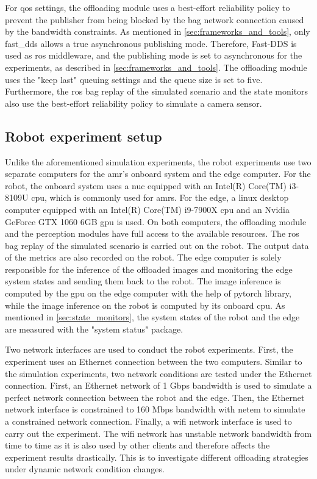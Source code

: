 For \gls{qos} settings, the offloading module uses a best-effort reliability policy to prevent the publisher from being blocked by the bag network connection caused by the bandwidth constraints. As mentioned in \cref{sec:frameworks_and_tools}, only \gls{fast_dds} allows a true asynchronous publishing mode. Therefore, Fast-DDS is used as \gls{ros} middleware, and the publishing mode is set to asynchronous for the experiments, as described in \cref{sec:frameworks_and_tools}. The offloading module uses the "keep last" queuing settings and the queue size is set to five. Furthermore, the \gls{ros} bag replay of the simulated scenario and the state monitors also use the best-effort reliability policy to simulate a camera sensor. 

\subsection{Robot experiment setup}

Unlike the aforementioned simulation experiments, the robot experiments use two separate computers for the \gls{amr}'s onboard system and the edge computer. For the robot, the onboard system uses a \gls{nuc} equipped with an Intel(R) Core(TM) i3-8109U \gls{cpu}, which is commonly used for \glspl{amr}. For the edge, a \gls{linux} desktop computer equipped with an Intel(R) Core(TM) i9-7900X \gls{cpu} and an Nvidia GeForce GTX 1060 6GB \gls{gpu} is used. On both computers, the offloading module and the perception modules have full access to the available resources. The \gls{ros} bag replay of the simulated scenario is carried out on the robot. The output data of the metrics are also recorded on the robot. The edge computer is solely responsible for the inference of the offloaded images and monitoring the edge system states and sending them back to the robot. The image inference is computed by the \gls{gpu} on the edge computer with the help of \gls{pytorch} library, while the image inference on the robot is computed by its onboard \gls{cpu}. As mentioned in \cref{sec:state_monitors}, the system states of the robot and the edge are measured with the "system status" package.

Two network interfaces are used to conduct the robot experiments. First, the experiment uses an Ethernet connection between the two computers. Similar to the simulation experiments, two network conditions are tested under the Ethernet connection. First, an Ethernet network of 1 Gbps bandwidth is used to simulate a perfect network connection between the robot and the edge. Then, the Ethernet network interface is constrained to 160 Mbps bandwidth with \gls{netem} to simulate a constrained network connection. Finally, a \gls{wifi} network interface is used to carry out the experiment. The \gls{wifi} network has unstable network bandwidth from time to time as it is also used by other clients and therefore affects the experiment results drastically. This is to investigate different offloading strategies under dynamic network condition changes.

